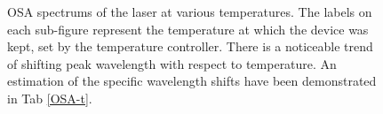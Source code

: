\documentclass[12pt,a4paper]{report}
\begin{document}
\begin{figure}
    \centering
    \quad
    \quad
    \quad
    \caption{OSA spectrums of the laser at various temperatures. The labels on each sub-figure represent the temperature at which the device was kept, set by the temperature controller. There is a noticeable trend of shifting peak wavelength with respect to temperature. An estimation of the specific wavelength shifts have been demonstrated in Tab \ref{OSA-t}.}
    \label{OSA}%
    \vspace{-12pt}
\end{figure}
\end{document}
